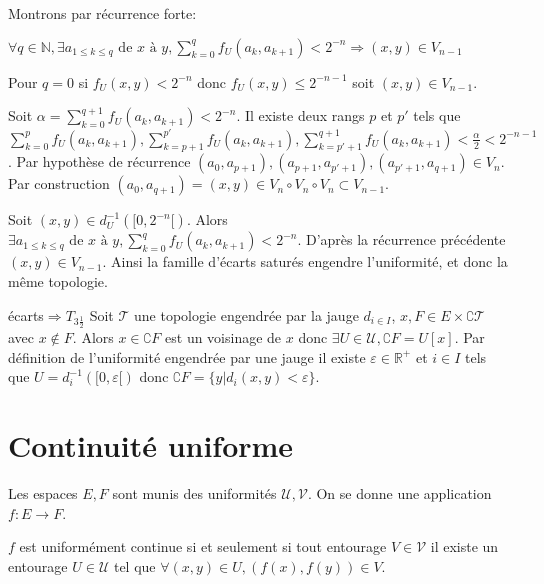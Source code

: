 \documentclass[a4paper, 11pt, french]{book}
\newenvironment{itemise}{\itemize}{\enditemize}
\theoremstyle{plain} %
\theoremstyle{definition} %
\theoremstyle{remark} %
\newcommand{\1}{\mathds{1}}
\newcommand{\infegal}{\leqslant}
\newcommand{\inv}[1]{#1^{-1}}
\newcommand{\N}{\mathbb{N}}
\newcommand{\R}{\mathbb{R}}
\begin{document}
\begin{itemise}
\begin{itemise}
		\item Montrons par récurrence forte:
		\begin{itemise}
			\item $\forall q\in\N, \exists a_{1\infegal k\infegal q}\text{ de }x\text{ à }y, \sum_{k=0}^qf_U(a_k, a_{k+1})<2^{-n}\Rightarrow (x, y)\in V_{n-1}$
			\item Pour $q=0$ si $f_U(x, y)<2^{-n}$ donc $f_U(x, y)\infegal2^{-n-1}$ soit $(x, y)\in V_{n-1}$.
			\item Soit $\alpha=\sum_{k=0}^{q+1}f_U(a_k, a_{k+1})<2^{-n}$.
			Il existe deux rangs $p$ et $p'$ tels que $\sum_{k=0}^pf_U(a_k, a_{k+1}), \sum_{k=p+1}^{p'}f_U(a_k, a_{k+1}), \sum_{k=p'+1}^{q+1}f_U(a_k, a_{k+1})<\frac{\alpha}{2}<2^{-n-1}$.
			Par hypothèse de récurrence $(a_0, a_{p+1}), (a_{p+1}, a_{p'+1}), (a_{p'+1}, a_{q+1})\in V_n$.
			Par construction $(a_0, a_{q+1})=(x, y)\in V_n\circ V_n\circ V_n\subset V_{n-1}$.
		\end{itemise}
		\item Soit $(x, y)\in\inv{d_U}([0, 2^{-n}[)$.
		Alors $\exists a_{1\infegal k\infegal q}\text{ de }x\text{ à }y, \sum_{k=0}^qf_U(a_k, a_{k+1})<2^{-n}$.
		D'après la récurrence précédente $(x, y)\in V_{n-1}$.
	\end{itemise}
	Ainsi la famille d'écarts saturés engendre l'uniformité, et donc la même topologie.
	\item[écarts$\Rightarrow T_{3\frac{1}{2}}$] Soit $\mathscr{T}$ une topologie engendrée par la jauge $d_{i\in I}$, $x, F\in E\times\complement\mathscr{T}$ avec $x\notin F$.
	Alors $x\in\complement F$ est un voisinage de $x$ donc $\exists U\in\mathscr{U}, \complement F=U[x]$.
	Par définition de l'uniformité engendrée par une jauge il existe $\varepsilon\in\R^+$ et $i\in I$ tels que $U=\inv{d_i}([0, \varepsilon[)$ donc $\complement F=\{y|d_i(x, y)<\varepsilon\}$.
\end{itemise}

\section{Continuité uniforme}

Les espaces $E, F$ sont munis des uniformités $\mathscr{U}, \mathscr{V}$.
On se donne une application $f:E\rightarrow F$.

$f$ est uniformément continue si et seulement si tout entourage $V\in\mathscr{V}$ il existe un entourage $U\in\mathscr{U}$ tel que $\forall (x, y)\in U, (f(x), f(y))\in V$.
\end{document}
